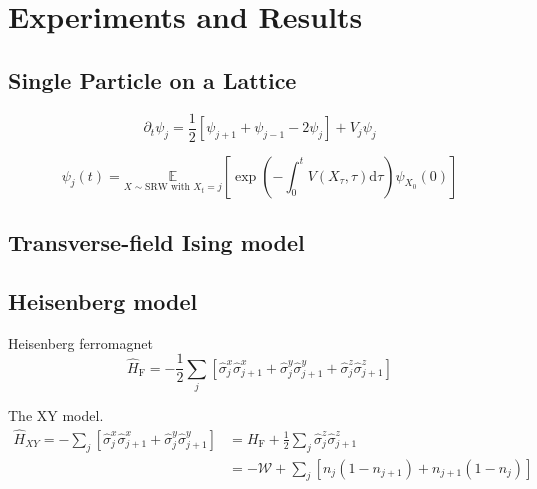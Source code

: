 
\chapter{Experiments and Results}
\label{chapter6}

\ifpdf
\graphicspath{{Chapter6/Figs/Raster/}{Chapter6/Figs/PDF/}{Chapter6/Figs/}}
\else
\graphicspath{{Chapter6/Figs/Vector/}{Chapter6/Figs/}}
\fi

\section{Single Particle on a Lattice}
\begin{equation}
	\partial_{t} \psi_{j}=\frac{1}{2}\left[\psi_{j+1}+\psi_{j-1}-2 \psi_{j}\right]+V_{j} \psi_{j}
\end{equation}

\begin{equation}
	\psi_{j}(t)=\underset{X \sim \mathrm{SRW} \text { with } X_{t}=j}{\mathbb{E}} \left[\exp \left(-\int_{0}^{t}  V\left(X_{\tau}, \tau\right) \mathrm{d} \tau \right) \psi_{X_{0}}(0)\right]
\end{equation}

\section{Transverse-field Ising model}
\label{sec:res-im}

\section{Heisenberg model}
\label{sec:res-hm}

Heisenberg ferromagnet
\begin{equation}
	\hat H_{\mathrm{F}}=-\frac{1}{2} \sum_{j}\left[\hat{\sigma}_{j}^{x} \hat{\sigma}_{j+1}^{x}+\hat{\sigma}_{j}^{y} \hat{\sigma}_{j+1}^{y}+\hat{\sigma}_{j}^{z} \hat{\sigma}_{j+1}^{z}\right]
\end{equation}

The XY model.
\begin{equation}
	\begin{aligned} 
		\hat H_{X Y}=-\sum_{j}\left[\hat{\sigma}_{j}^{x} \hat{\sigma}_{j+1}^{x}+\hat{\sigma}_{j}^{y} \hat{\sigma}_{j+1}^{y}\right] &=H_{\mathrm{F}}+\frac{1}{2} \sum_{j} \hat{\sigma}_{j}^{z} \hat{\sigma}_{j+1}^{z} \\ 						&=-\mathcal{W}+\sum_{j}\left[n_{j}\left(1-n_{j+1}\right)+n_{j+1}\left(1-n_{j}\right)\right] 
	\end{aligned}
\end{equation}

